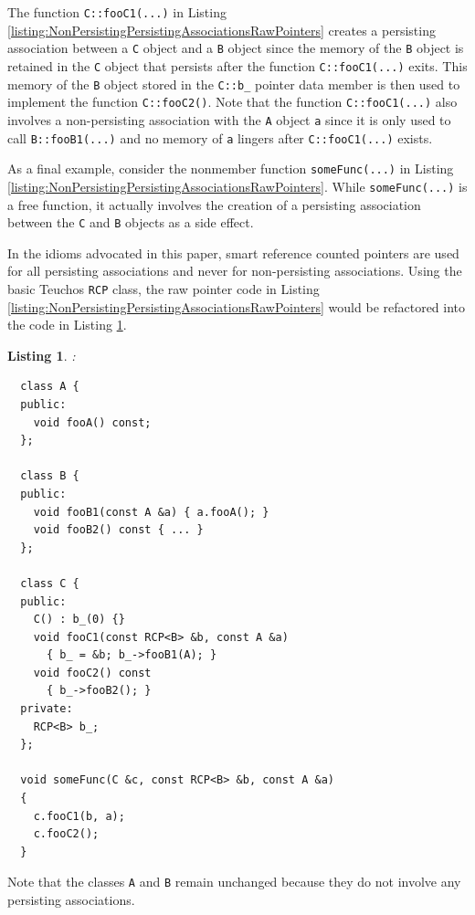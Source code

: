 \documentclass[pdf,ps2pdf,11pt]{SANDreport}
\newtheorem{listing}{Listing}
\begin{document}
The function {}\texttt{C::fooC1(...)} in Listing
{}\ref{listing:NonPersistingPersistingAssociationsRawPointers} creates
a persisting association between a {}\texttt{C} object and a
{}\texttt{B} object since the memory of the {}\texttt{B} object is
retained in the {}\texttt{C} object that persists after the function
{}\texttt{C::fooC1(...)} exits.  This memory of the {}\texttt{B}
object stored in the {}\texttt{C::b\_} pointer data member is then
used to implement the function {}\texttt{C::fooC2()}.  Note that the
function {}\texttt{C::fooC1(...)} also involves a non-persisting
association with the {}\texttt{A} object {}\texttt{a} since it is only
used to call {}\texttt{B::fooB1(...)} and no memory of {}\texttt{a}
lingers after {}\texttt{C::fooC1(...)} exists.

As a final example, consider the nonmember function
{}\texttt{someFunc(...)} in Listing
{}\ref{listing:NonPersistingPersistingAssociationsRawPointers}.  While
{}\texttt{someFunc(...)} is a free function, it actually involves the
creation of a persisting association between the {}\texttt{C} and
{}\texttt{B} objects as a side effect.

In the idioms advocated in this paper, smart reference counted
pointers are used for all persisting associations and never for
non-persisting associations.  Using the basic Teuchos {}\texttt{RCP}
class, the raw pointer code in Listing
{}\ref{listing:NonPersistingPersistingAssociationsRawPointers} would
be refactored into the code in Listing
{}\ref{listing:NonPersistingPersistingAssociationsRCP}.

\begin{listing}:\\
\label{listing:NonPersistingPersistingAssociationsRCP}
{\small\begin{verbatim}
  class A {
  public:
    void fooA() const;
  };

  class B {
  public:
    void fooB1(const A &a) { a.fooA(); }
    void fooB2() const { ... }
  };

  class C {
  public:
    C() : b_(0) {}
    void fooC1(const RCP<B> &b, const A &a)
      { b_ = &b; b_->fooB1(A); }
    void fooC2() const
      { b_->fooB2(); }
  private:
    RCP<B> b_;
  };

  void someFunc(C &c, const RCP<B> &b, const A &a)
  {
    c.fooC1(b, a);
    c.fooC2();
  }
\end{verbatim}}
\end{listing}

Note that the classes {}\texttt{A} and {}\texttt{B} remain unchanged
because they do not involve any persisting associations.
\end{document}
